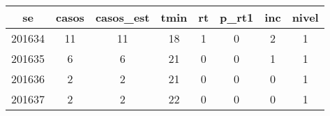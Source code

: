 \begin{tabular}{c|ccccccc}
  \hline
se & casos & casos\_est & tmin & rt & p\_rt1 & inc & nivel \\ 
  \hline
201634 & 11 & 11 & 18 & 1 & 0 & 2 & 1 \\ 
  201635 & 6 & 6 & 21 & 0 & 0 & 1 & 1 \\ 
  201636 & 2 & 2 & 21 & 0 & 0 & 0 & 1 \\ 
  201637 & 2 & 2 & 22 & 0 & 0 & 0 & 1 \\ 
   \hline
\end{tabular}
